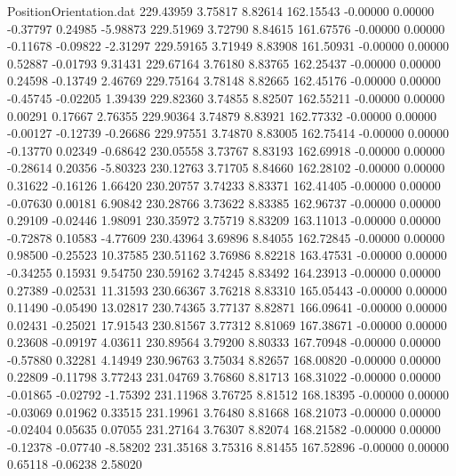 \begin{filecontents}{PositionOrientation.dat}
 229.43959    3.75817    8.82614   162.15543   -0.00000    0.00000   -0.37797    0.24985   -5.98873
 229.51969    3.72790    8.84615   161.67576   -0.00000    0.00000   -0.11678   -0.09822   -2.31297
 229.59165    3.71949    8.83908   161.50931   -0.00000    0.00000    0.52887   -0.01793    9.31431
 229.67164    3.76180    8.83765   162.25437   -0.00000    0.00000    0.24598   -0.13749    2.46769
 229.75164    3.78148    8.82665   162.45176   -0.00000    0.00000   -0.45745   -0.02205    1.39439
 229.82360    3.74855    8.82507   162.55211   -0.00000    0.00000    0.00291    0.17667    2.76355
 229.90364    3.74879    8.83921   162.77332   -0.00000    0.00000   -0.00127   -0.12739   -0.26686
 229.97551    3.74870    8.83005   162.75414   -0.00000    0.00000   -0.13770    0.02349   -0.68642
 230.05558    3.73767    8.83193   162.69918   -0.00000    0.00000   -0.28614    0.20356   -5.80323
 230.12763    3.71705    8.84660   162.28102   -0.00000    0.00000    0.31622   -0.16126    1.66420
 230.20757    3.74233    8.83371   162.41405   -0.00000    0.00000   -0.07630    0.00181    6.90842
 230.28766    3.73622    8.83385   162.96737   -0.00000    0.00000    0.29109   -0.02446    1.98091
 230.35972    3.75719    8.83209   163.11013   -0.00000    0.00000   -0.72878    0.10583   -4.77609
 230.43964    3.69896    8.84055   162.72845   -0.00000    0.00000    0.98500   -0.25523   10.37585
 230.51162    3.76986    8.82218   163.47531   -0.00000    0.00000   -0.34255    0.15931    9.54750
 230.59162    3.74245    8.83492   164.23913   -0.00000    0.00000    0.27389   -0.02531   11.31593
 230.66367    3.76218    8.83310   165.05443   -0.00000    0.00000    0.11490   -0.05490   13.02817
 230.74365    3.77137    8.82871   166.09641   -0.00000    0.00000    0.02431   -0.25021   17.91543
 230.81567    3.77312    8.81069   167.38671   -0.00000    0.00000    0.23608   -0.09197    4.03611
 230.89564    3.79200    8.80333   167.70948   -0.00000    0.00000   -0.57880    0.32281    4.14949
 230.96763    3.75034    8.82657   168.00820   -0.00000    0.00000    0.22809   -0.11798    3.77243
 231.04769    3.76860    8.81713   168.31022   -0.00000    0.00000   -0.01865   -0.02792   -1.75392
 231.11968    3.76725    8.81512   168.18395   -0.00000    0.00000   -0.03069    0.01962    0.33515
 231.19961    3.76480    8.81668   168.21073   -0.00000    0.00000   -0.02404    0.05635    0.07055
 231.27164    3.76307    8.82074   168.21582   -0.00000    0.00000   -0.12378   -0.07740   -8.58202
 231.35168    3.75316    8.81455   167.52896   -0.00000    0.00000    0.65118   -0.06238    2.58020

\end{filecontents}
